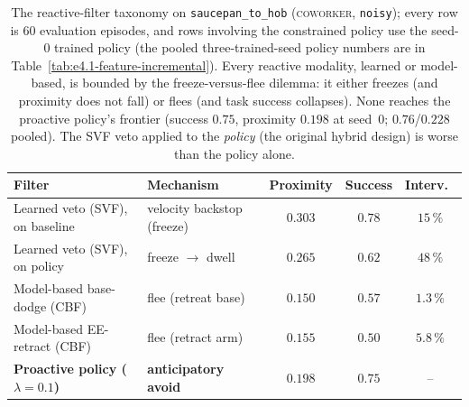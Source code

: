 \documentclass[11pt,a4paper]{report}
\newcommand{\coworker}{\textsc{coworker}}
\begin{document}
\begin{table}[h]
\centering
\caption{The reactive-filter taxonomy on \texttt{saucepan\_to\_hob}
(\coworker{}, \texttt{noisy}); every row is 60 evaluation episodes,
and rows involving the constrained policy use the seed-0 trained
policy (the pooled three-trained-seed policy numbers are in
Table~\ref{tab:e4.1-feature-incremental}). Every reactive modality,
learned or model-based, is bounded by the freeze-versus-flee dilemma:
it either freezes (and proximity does not fall) or flees (and task
success collapses). None reaches the proactive policy's frontier
(success $0.75$, proximity $0.198$ at seed~0; $0.76$/$0.228$ pooled).
The SVF veto applied to the \emph{policy} (the original hybrid design)
is worse than the policy alone.}
\label{tab:filter-taxonomy}
\small
\begin{tabular}{llccc}
\toprule
Filter & Mechanism & Proximity & Success & Interv.\ \\
\midrule
Learned veto (SVF), on baseline   & velocity backstop (freeze) & $0.303$ & $0.78$ & $15\,\%$ \\
Learned veto (SVF), on policy     & freeze $\to$ dwell         & $0.265$ & $0.62$ & $48\,\%$ \\
Model-based base-dodge (CBF)      & flee (retreat base)        & $0.150$ & $0.57$ & $1.3\,\%$ \\
Model-based EE-retract (CBF)      & flee (retract arm)         & $0.155$ & $0.50$ & $5.8\,\%$ \\
\textbf{Proactive policy ($\lambda{=}0.1$)} & \textbf{anticipatory avoid} & $\mathbf{0.198}$ & $\mathbf{0.75}$ & -- \\
\bottomrule
\end{tabular}
\end{table}
\end{document}
